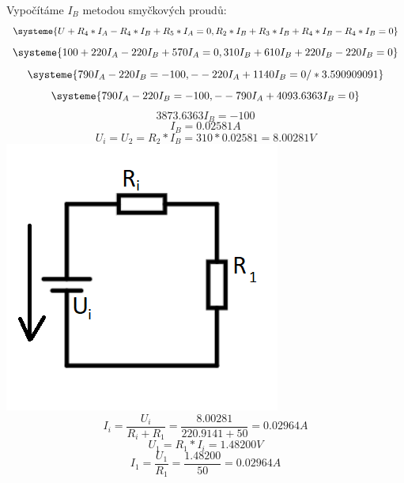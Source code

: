 \documentclass[11pt]{article}
\begin{document}
Vypočítáme $I_B$ metodou smyčkových proudů:\\
\begin{equation*}
  \systeme{
  U + R_4*I_A - R_4 * I_B + R_5 * I_A  = 0,
  R_2 * I_B + R_3 * I_B + R_4 * I_B - R_4 * I_B = 0
  }
\end{equation*}
\begin{equation*}
  \systeme{
  100 + 220I_A - 220I_B + 570I_A  = 0,
  310I_B + 610I_B + 220I_B - 220I_B = 0
  }
\end{equation*}
\begin{equation*}
  \systeme{
  790I_A - 220I_B  = -100,
  - -220I_A + 1140I_B = 0 / * 3.590909091
  }
\end{equation*}
\begin{equation*}
  \systeme{
  790I_A - 220I_B  = -100,
  - -790I_A + 4093.6363I_B = 0
  }
\end{equation*}
$$3873.6363I_B = - 100$$
$$I_B = 0.02581A$$
$$U_i = U_2 = R_2 * I_B = 310 * 0.02581 = 8.00281V $$
\includegraphics[width=0.7\linewidth]{priklad2_nahrazeni.png}\\
$$I_i = \frac{U_i}{R_i + R_1} = \frac{8.00281}{220.9141 + 50} = 0.02964A$$
$$U_1 = R_1 * I_i = 1.48200V$$
$$I_1 = \frac{U_1}{R_1} = \frac{1.48200}{50} = 0.02964A$$
\end{document}
